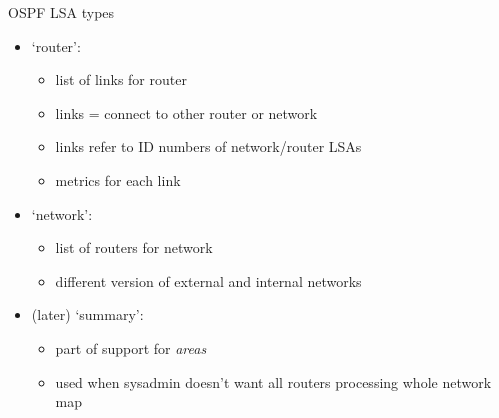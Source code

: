 \begin{frame}{OSPF LSA types}
\begin{itemize}
\item `router':
    \begin{itemize}
    \item list of links for router
    \item links = connect to other router or network
    \item links refer to ID numbers of network/router LSAs
    \item metrics for each link
    \end{itemize}
\item `network':
    \begin{itemize}
    \item list of routers for network
    \item different version of external and internal networks
    \end{itemize}
\item (later) `summary':
    \begin{itemize}
    \item part of support for \textit{areas}
    \item used when sysadmin doesn't want all routers processing whole network map
    \end{itemize}
\end{itemize}
\end{frame}

